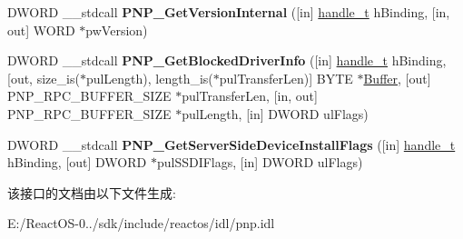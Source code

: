 \begin{DoxyCompactItemize}
D\+W\+O\+RD \+\_\+\+\_\+stdcall {\bfseries P\+N\+P\+\_\+\+Get\+Version\+Internal} (\mbox{[}in\mbox{]} \hyperlink{interfacevoid}{handle\+\_\+t} h\+Binding, \mbox{[}in, out\mbox{]} W\+O\+RD $\ast$pw\+Version)
\item 
\mbox{\label{interfacepnp_a917e6669261fd777220a9cdac1c90abf}} 
D\+W\+O\+RD \+\_\+\+\_\+stdcall {\bfseries P\+N\+P\+\_\+\+Get\+Blocked\+Driver\+Info} (\mbox{[}in\mbox{]} \hyperlink{interfacevoid}{handle\+\_\+t} h\+Binding, \mbox{[}out, size\+\_\+is($\ast$pul\+Length), length\+\_\+is($\ast$pul\+Transfer\+Len)\mbox{]} B\+Y\+TE $\ast$\hyperlink{class_buffer}{Buffer}, \mbox{[}out\mbox{]} P\+N\+P\+\_\+\+R\+P\+C\+\_\+\+B\+U\+F\+F\+E\+R\+\_\+\+S\+I\+ZE $\ast$pul\+Transfer\+Len, \mbox{[}in, out\mbox{]} P\+N\+P\+\_\+\+R\+P\+C\+\_\+\+B\+U\+F\+F\+E\+R\+\_\+\+S\+I\+ZE $\ast$pul\+Length, \mbox{[}in\mbox{]} D\+W\+O\+RD ul\+Flags)
\item 
\mbox{\label{interfacepnp_a3a97cfa957464dcf6252a1ea2e048f21}} 
D\+W\+O\+RD \+\_\+\+\_\+stdcall {\bfseries P\+N\+P\+\_\+\+Get\+Server\+Side\+Device\+Install\+Flags} (\mbox{[}in\mbox{]} \hyperlink{interfacevoid}{handle\+\_\+t} h\+Binding, \mbox{[}out\mbox{]} D\+W\+O\+RD $\ast$pul\+S\+S\+D\+I\+Flags, \mbox{[}in\mbox{]} D\+W\+O\+RD ul\+Flags)
\end{DoxyCompactItemize}


该接口的文档由以下文件生成\+:\begin{DoxyCompactItemize}
\item 
E\+:/\+React\+O\+S-\/0../sdk/include/reactos/idl/pnp.\+idl\end{DoxyCompactItemize}
